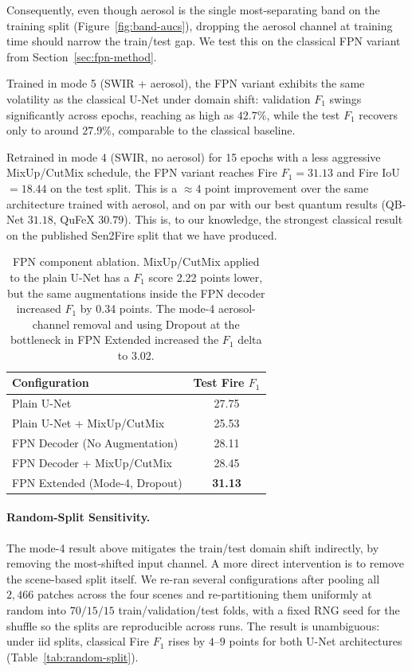 \documentclass{article}
\begin{document}
Consequently, even though aerosol is the single most-separating band on the training split (Figure~\ref{fig:band-aucs}), dropping the aerosol channel at training time should narrow the train/test gap. We test this on the classical FPN variant from Section~\ref{sec:fpn-method}.

Trained in mode 5 (SWIR + aerosol), the FPN variant exhibits the same volatility as the classical U-Net under domain shift: validation $F_1$ swings significantly across epochs, reaching as high as $42.7\%$, while the test $F_1$ recovers only to around $27.9\%$, comparable to the classical baseline. 

Retrained in mode 4 (SWIR, no aerosol) for 15 epochs with a less aggressive MixUp/CutMix schedule, the FPN variant reaches Fire $F_1 = \mathbf{31.13}$ and Fire IoU $= 18.44$ on the test split. This is a $\approx 4$ point improvement over the same architecture trained with aerosol, and on par with our best quantum results (QB-Net $31.18$, QuFeX $30.79$). This is, to our knowledge, the strongest classical result on the published Sen2Fire split that we have produced.

\begin{table}[H]
    \centering
    \begin{tabular}{lc}
        \toprule
        Configuration & Test Fire $F_1$ \\
        \midrule
        Plain U-Net & 27.75 \\
        Plain U-Net + MixUp/CutMix & 25.53 \\
        FPN Decoder (No Augmentation) & 28.11 \\
        FPN Decoder + MixUp/CutMix & 28.45 \\
        FPN Extended (Mode-4, Dropout) & \textbf{31.13} \\
        \bottomrule
    \end{tabular}
    \caption{FPN component ablation. MixUp/CutMix applied to the plain U-Net has a $F_1$ score 2.22 points lower, but the same augmentations inside the FPN decoder increased $F_1$ by 0.34 points. The mode-4 aerosol-channel removal and using Dropout at the bottleneck in FPN Extended increased the $F_1$ delta to 3.02.}
    \label{tab:fpn-ablation}
\end{table}

\paragraph{Random-Split Sensitivity.}
The mode-4 result above mitigates the train/test domain shift indirectly, by removing the most-shifted input channel. A more direct intervention is to remove the scene-based split itself. We re-ran several configurations after pooling all $2{,}466$ patches across the four scenes and re-partitioning them uniformly at random into $70/15/15$ train/validation/test folds, with a fixed RNG seed for the shuffle so the splits are reproducible across runs. The result is unambiguous: under iid splits, classical Fire $F_1$ rises by $4$--$9$ points for both U-Net architectures (Table~\ref{tab:random-split}).
\end{document}
